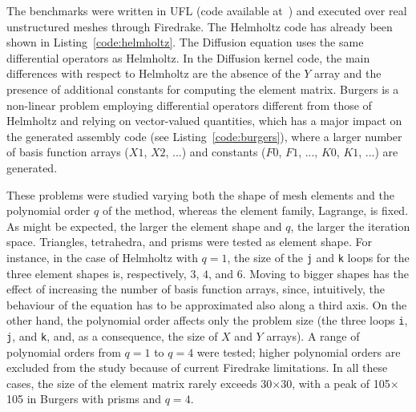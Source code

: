 The benchmarks were written in UFL (code available at~\cite{ufl-code}) and executed over real unstructured meshes through Firedrake. The Helmholtz code has already been shown in Listing~\ref{code:helmholtz}. The Diffusion equation uses the same differential operators as Helmholtz. In the Diffusion kernel code, the main differences with respect to Helmholtz are the absence of the $Y$ array and the presence of additional constants for computing the element matrix. Burgers is a non-linear problem employing differential operators different from those of Helmholtz and relying on vector-valued quantities, which has a major impact on the generated assembly code (see Listing~\ref{code:burgers}), where a larger number of basis function arrays ($X1$, $X2$, ...) and constants ($F0$, $F1$, ..., $K0$, $K1$,
...) are generated. 

These problems were studied varying both the shape of mesh elements and the polynomial order $q$ of the method, whereas the element family, Lagrange, is fixed. As might be expected, the larger the element shape and $q$, the larger the iteration space. Triangles, tetrahedra, and prisms were tested as element shape. For instance, in the case of Helmholtz with $q=1$, the size of the \texttt{j} and \texttt{k} loops for the three element shapes is, respectively, $3$, $4$, and $6$. Moving to bigger shapes has the effect of increasing the number of basis function arrays, since, intuitively, the behaviour of the equation has to be approximated also along a third axis. On the other hand, the polynomial order affects only the problem size (the three loops \texttt{i}, \texttt{j}, and \texttt{k}, and, as a consequence, the size of $X$ and $Y$ arrays). A range of polynomial orders from $q=1$ to $q=4$ were tested; higher polynomial orders are excluded from the study because of current Firedrake limitations. In all these cases, the size of the element matrix rarely exceeds 30$\times$30, with a peak of 105$\times$105 in Burgers with prisms and $q=4$.

